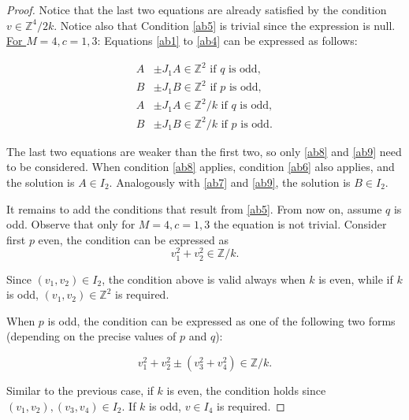 \documentclass[12pt]{amsart}
\theoremstyle{plain}
\theoremstyle{definition}
\theoremstyle{remark}
\begin{document}
\begin{proof}
Notice that the last two equations are already satisfied by the condition $v \in \mathbb{Z}^4/{2k}$. Notice also that Condition \eqref{ab5} is trivial since the expression is null.\\


\underline{For $M=4, c=1,3$}: Equations \eqref{ab1} to \eqref{ab4} can be expressed as follows:

\begin{align}
   A& \pm J_1 A \in \mathbb{Z}^2 \text{ if } q \text{ is odd}, \label{ab8}\\
   B& \pm J_1 B \in \mathbb{Z}^2 \text{ if } p \text{ is odd}, \label{ab9}\\
   A& \pm J_1 A \in \mathbb{Z}^2/k \text{ if } q \text{ is odd}, \nonumber \\
   B& \pm J_1 B \in \mathbb{Z}^2/k \text{ if } p \text{ is odd}. \nonumber
\end{align}

The last two equations are weaker than the first two, so only \eqref{ab8} and \eqref{ab9} need to be considered. When condition \eqref{ab8} applies, condition \eqref{ab6} also applies, and the solution is $A \in I_2$. Analogously with \eqref{ab7} and \eqref{ab9}, the solution is $B \in I_2$.

It remains to add the conditions that result from \eqref{ab5}. From now on, assume $q$ is odd. Observe that only for $M=4, c=1,3$ the equation is not trivial. Consider first $p$ even, the condition can be expressed as
$$ v_1^2 + v_2^2 \in \mathbb{Z}/k. $$

Since $(v_1,v_2) \in  I_2$, the condition above is valid always when $k$ is even, while if $k$ is odd, $(v_1,v_2) \in \mathbb{Z}^2$ is required. 

When $p$ is odd, the condition can be expressed as one of the following two forms (depending on the precise values of $p$ and $q$):

$$ v_1^2 + v_2^2 \pm (v_3^2 + v_4^2) \in \mathbb{Z}/k.$$

Similar to the previous case, if $k$ is even, the condition holds since $(v_1,v_2), (v_3,v_4) \in I_2$. If $k$ is odd, $v \in I_4$ is required.

\end{proof}
\end{document}
